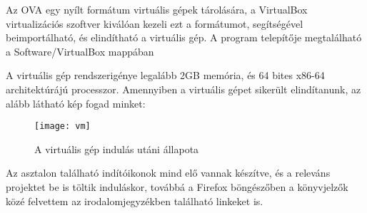 Az OVA egy nyílt formátum virtuális gépek tárolására, a VirtualBox virtualizációs szoftver kiválóan kezeli ezt a formátumot, segítségével beimportálható, és elindítható a virtuális gép. A program telepítője megtalálható a Software/VirtualBox mappában\ujsor

A virtuális gép rendszerigénye legalább 2GB memória, és 64 bites x86-64 architektúrájú processzor. Amennyiben a virtuális gépet sikerült elindítanunk, az alább látható kép fogad minket:

\begin{figure}[ht]
	\texttt{[image: vm]}
	\centering
	\caption{A virtuális gép indulás utáni állapota}
	\label{fig:vm}
\end{figure}

Az asztalon található indítóikonok mind elő vannak készítve, és a releváns projektet be is töltik induláskor, továbbá a Firefox böngészőben a könyvjelzők közé felvettem az irodalomjegyzékben található linkeket is.
